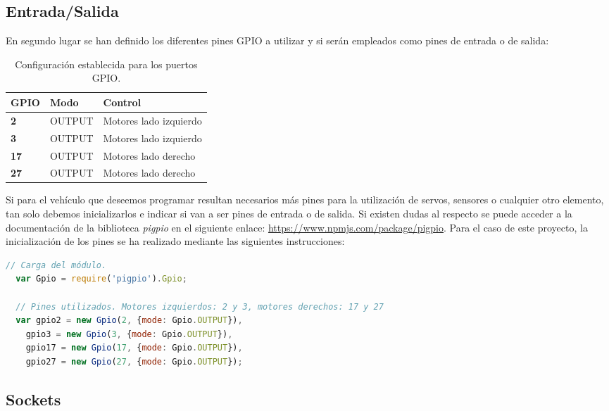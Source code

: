 \subsection{Entrada/Salida}

En segundo lugar se han definido los diferentes pines GPIO a utilizar y si serán empleados como pines de entrada o de salida:

\begin{table}[H]
  \begin{center}
    \begin{tabular}{|p{2.5cm}|p{2.5cm}|p{4.5cm}|}
      \hline
      {\textbf{GPIO}} & \textbf{ Modo } & \textbf{ Control }\\
      \hline
      {\textbf{ 2 }} & { OUTPUT } & { Motores lado izquierdo }  \\
     \hline
      {\textbf{ 3 }} & { OUTPUT } & { Motores lado izquierdo } \\
      \hline
      {\textbf{ 17 }} & { OUTPUT } & {  Motores lado derecho } \\
      \hline
      {\textbf{ 27 }} & { OUTPUT } & { Motores lado derecho } \\
     \hline   
    \end{tabular}
  \end{center}
\caption{ Configuración establecida para los puertos GPIO. }
\end{table}


Si para el vehículo que deseemos programar resultan necesarios más pines para la utilización de servos, sensores o cualquier otro elemento, tan solo debemos inicializarlos e indicar si van a ser pines de entrada
o de salida. Si existen dudas al respecto se puede acceder a la documentación de la biblioteca \emph{pigpio} en el siguiente enlace: \url{https://www.npmjs.com/package/pigpio}.
Para el caso de este proyecto, la inicialización de los pines se ha realizado mediante las siguientes instrucciones:

\begin{lstlisting}[language=JavaScript]
  // Carga del módulo.
  var Gpio = require('pigpio').Gpio;

  // Pines utilizados. Motores izquierdos: 2 y 3, motores derechos: 17 y 27
  var gpio2 = new Gpio(2, {mode: Gpio.OUTPUT}),
    gpio3 = new Gpio(3, {mode: Gpio.OUTPUT}),
    gpio17 = new Gpio(17, {mode: Gpio.OUTPUT}),
    gpio27 = new Gpio(27, {mode: Gpio.OUTPUT});
\end{lstlisting}


\subsection{Sockets}

